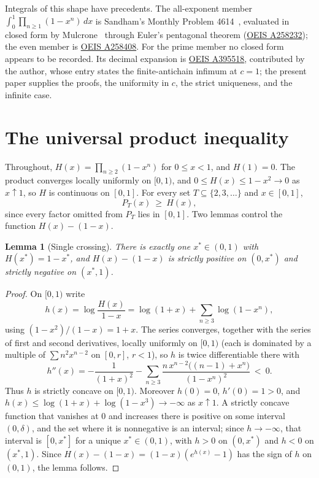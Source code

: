 \documentclass[11pt]{article}
\newtheorem{lemma}[theorem]{Lemma}
\theoremstyle{remark}
\begin{document}
Integrals of this shape have precedents. The all-exponent member
$\int_0^1\prod_{n\ge1}(1-x^n)\,dx$ is Sandham's Monthly Problem
4614~\cite{Sandham1954}, evaluated in closed form by
Mulcrone~\cite{Mulcrone1956} through Euler's pentagonal theorem
(\href{https://oeis.org/A258232}{OEIS A258232}); the even member is
\href{https://oeis.org/A258408}{OEIS A258408}. For the prime member no
closed form appears to be recorded. Its decimal expansion is
\href{https://oeis.org/A395518}{OEIS A395518}, contributed by the author, whose entry states the
finite-antichain infimum at $c=1$; the present paper supplies the
proofs, the uniformity in $c$, the strict uniqueness, and the infinite
case.

\section{The universal product inequality}\label{sec:running}

Throughout, $H(x)=\prod_{n\ge2}(1-x^n)$ for $0\le x<1$, and $H(1)=0$.
The product converges locally uniformly on $[0,1)$, and
$0\le H(x)\le1-x^2\to0$ as $x\uparrow1$, so $H$ is continuous on
$[0,1]$. For every set $T\subseteq\{2,3,\dots\}$ and $x\in[0,1]$,
\begin{equation}\label{eq:antitone}
  P_T(x)\ \ge\ H(x),
\end{equation}
since every factor omitted from $P_T$ lies in $[0,1]$. Two lemmas
control the function $H(x)-(1-x)$.

\begin{lemma}[Single crossing]\label{lem:crossing}
There is exactly one $x^*\in(0,1)$ with $H(x^*)=1-x^*$, and
$H(x)-(1-x)$ is strictly positive on $(0,x^*)$ and strictly negative on
$(x^*,1)$.
\end{lemma}

\begin{proof}
On $[0,1)$ write
\[
  h(x)=\log\frac{H(x)}{1-x}=\log(1+x)+\sum_{n\ge3}\log(1-x^n),
\]
using $(1-x^2)/(1-x)=1+x$. The series converges, together with the
series of first and second derivatives, locally uniformly on $[0,1)$
(each is dominated by a multiple of $\sum n^2x^{n-2}$ on $[0,r]$,
$r<1$), so $h$ is twice differentiable there with
\[
  h''(x)=-\frac1{(1+x)^2}-\sum_{n\ge3}
  \frac{n\,x^{n-2}\bigl((n-1)+x^n\bigr)}{(1-x^n)^2}\ <\ 0 .
\]
Thus $h$ is strictly concave on $[0,1)$. Moreover $h(0)=0$,
$h'(0)=1>0$, and $h(x)\le\log(1+x)+\log(1-x^3)\to-\infty$ as
$x\uparrow1$. A strictly concave function that vanishes at $0$ and
increases there is positive on some interval $(0,\delta)$, and the set
where it is nonnegative is an interval; since $h\to-\infty$, that
interval is $[0,x^*]$ for a unique $x^*\in(0,1)$, with $h>0$ on
$(0,x^*)$ and $h<0$ on $(x^*,1)$. Since
$H(x)-(1-x)=(1-x)(e^{h(x)}-1)$ has the sign of $h$ on $(0,1)$, the lemma
follows.
\end{proof}
\end{document}
